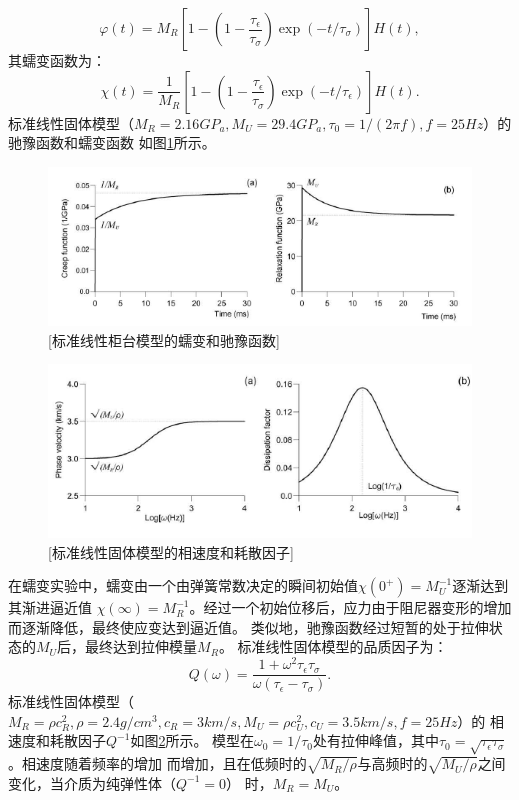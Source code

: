 \begin{equation}
	\varphi(t)=M_R[1-(1-\frac{\tau_\epsilon}{\tau_\sigma})\exp(-t/\tau_\sigma)]H(t),
\end{equation}
其蠕变函数为：
\begin{equation}
	\chi(t)=\frac{1}{M_R}[1-(1-\frac{\tau_\epsilon}{\tau_\sigma})\exp(-t/\tau_\epsilon)]H(t).
\end{equation}
标准线性固体模型（$M_R=2.16GP_a,M_U=29.4GP_a,\tau_0=1/(2\pi f),f=25Hz$）的驰豫函数和蠕变函数
如图\ref{fig:sls_creep}所示。
\begin{figure}[!htbp]
	    \centering
		\includegraphics[width=0.9\linewidth]{figure/sls_creep}
		[标准线性柜台模型的蠕变和驰豫函数]
		\label{fig:sls_creep}
\end{figure}
\begin{figure}[!htbp]
	    \centering
		\includegraphics[width=0.8\linewidth]{figure/sls_vp}
		[标准线性固体模型的相速度和耗散因子]
		\label{fig:sls_vp}
\end{figure}
在蠕变实验中，蠕变由一个由弹簧常数决定的瞬间初始值$\chi(0^+)=M_U^{-1}$逐渐达到其渐进逼近值
$\chi(\infty)=M_R^{-1}$。经过一个初始位移后，应力由于阻尼器变形的增加而逐渐降低，最终使应变达到逼近值。
类似地，驰豫函数经过短暂的处于拉伸状态的$M_U$后，最终达到拉伸模量$M_R$。
标准线性固体模型的品质因子为：
\begin{equation}
	Q(\omega)=\frac{1+\omega^2\tau_\epsilon\tau_\sigma}{\omega(\tau_\epsilon-\tau_\sigma)}.
\end{equation}
标准线性固体模型（$M_R=\rho c_R^2,\rho=2.4g/cm^3,c_R=3km/s,M_U=\rho c_U^2,c_U=3.5km/s,f=25Hz$）的
相速度和耗散因子$Q^{-1}$如图\ref{fig:sls_vp}所示。
模型在$\omega_0=1/\tau_0$处有拉伸峰值，其中$\tau_0=\sqrt{\tau_\epsilon\tau_\sigma}$。相速度随着频率的增加
而增加，且在低频时的$\sqrt{M_R/\rho}$与高频时的$\sqrt{M_U/\rho}$之间变化，当介质为纯弹性体（$Q^{-1}=0$）
时，$M_R=M_U$。

